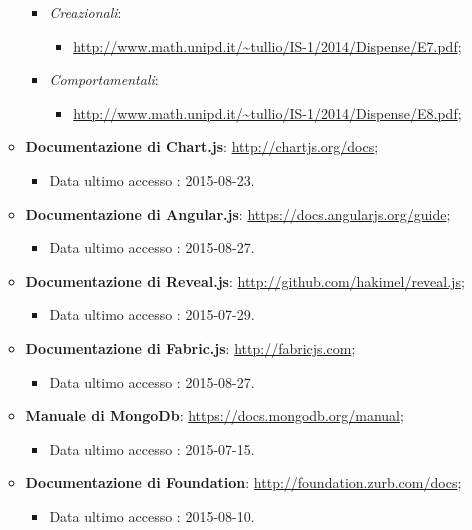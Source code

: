 \begin{itemize}
\begin{itemize}
\begin{itemize}
						\item \textit{Creazionali}:
						\begin{itemize}
						\item \url{http://www.math.unipd.it/~tullio/IS-1/2014/Dispense/E7.pdf};
						\end{itemize}
						\item \textit{Comportamentali}:
						\begin{itemize}
						\item \url{http://www.math.unipd.it/~tullio/IS-1/2014/Dispense/E8.pdf};
						\end{itemize}
					\end{itemize}
					\item \textbf{Documentazione di Chart.js}: \url{http://chartjs.org/docs};
					\begin{itemize}
						\item Data ultimo accesso : 2015-08-23.						
					\end{itemize}

					\item \textbf{Documentazione di Angular.js}: \url{https://docs.angularjs.org/guide};
					\begin{itemize}
						\item Data ultimo accesso : 2015-08-27.						
					\end{itemize}
					
					\item \textbf{Documentazione di Reveal.js}: \url{http://github.com/hakimel/reveal.js};
					\begin{itemize}
						\item Data ultimo accesso : 2015-07-29.						
					\end{itemize}
					
					\item \textbf{Documentazione di Fabric.js}: \url{http://fabricjs.com};
					\begin{itemize}
						\item Data ultimo accesso : 2015-08-27.						
					\end{itemize}
					
					\item \textbf{Manuale di MongoDb}: \url{https://docs.mongodb.org/manual};
					\begin{itemize}
						\item Data ultimo accesso : 2015-07-15.						
					\end{itemize}
					
					\item \textbf{Documentazione di Foundation}: \url{http://foundation.zurb.com/docs};
					\begin{itemize}
						\item Data ultimo accesso : 2015-08-10.						
					\end{itemize}
					

\end{itemize}
\end{itemize}

